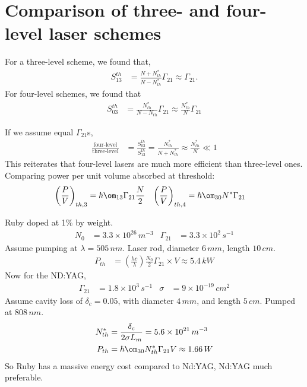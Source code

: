 \documentclass[a4paper, 11pt, normalem]{report}
\begin{document}
\section{Comparison of three- and four-level laser schemes}
\begin{multicols}{2}
For a three-level scheme, we found that,
\begin{align}
    S_{13}^{th} &= \frac{N+N_{th}^*}{N-N_{th}^*}\Gamma_{21} \approx \Gamma_{21}.
\end{align}
For four-level schemes, we found that
\begin{align}
    S_{03}^{th} &= \frac{N_{th}^*}{N-N_{th}}\Gamma_{21} \approx \frac{N_{th}^*}{N}\Gamma_{21}
\end{align}
\end{multicols}
If we assume equal $\Gamma_{21}$s,
\begin{align}
    \frac{\text{four-level}}{\text{three-level}} &= \frac{S_{03}^{th}}{S_{13}^{th}} = \frac{N_{th}^*}{N+N_{th}^*} \approx \frac{N_{th}^*}{N} \ll 1
\end{align}
This reiterates that four-level lasers are much more efficient than three-level ones.
Comparing power per unit volume absorbed at threshold:
\begin{align}
    \left(\frac{P}{V}\right)_{th,3} &= \hbar\om_{13}\Gamma_{21}\frac{N}{2} & \left(\frac{P}{V}\right)_{th,4} &= \hbar\om_{30}N^*\Gamma_{21}
\end{align}

\begin{example}
    Ruby doped at 1\% by weight.
    \begin{align}
        N_0 &= 3.3\times10^{26}\,m^{-3} & \Gamma_{21} &= 3.3\times10^2\,s^{-1}
    \end{align}
    Assume pumping at $\lambda=505\,nm$.
    Laser rod, diameter $6\,mm$, length $10\,cm$.
    \begin{align}
        P_{th} &= \left(\frac{hc}{\lambda}\right)\frac{N_0}{2}\Gamma_{21}\times V \approx 5.4\,kW
    \end{align}
    Now for the ND:YAG,
    \begin{align}
        \Gamma_{21} &= 1.8\times10^3\,s^{-1} & \sigma &= 9\times10^{-19}\,cm^2
    \end{align}
    Assume cavity loss of $\delta_c = 0.05$, with diameter $4\,mm$, and length $5\,cm$.
    Pumped at $808\,nm$.
    \begin{align}
        N_{th}^* &= \frac{\delta_c}{2\sigma L_m} = 5.6\times10^{21}\,m^{-3} \\
        P_{th} &= \hbar\om_{30}N_{th}^*\Gamma_{21}V \approx 1.66\,W
    \end{align}
    So Ruby has a massive energy cost compared to Nd:YAG, Nd:YAG much preferable.
\end{example}
\end{document}
